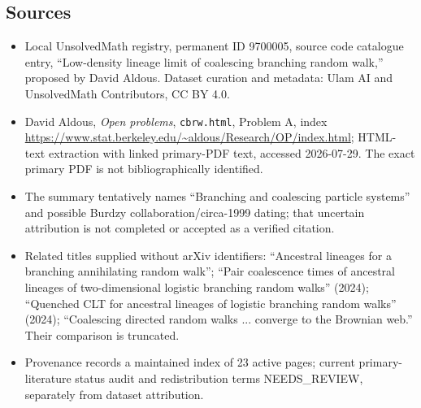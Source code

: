 \documentclass[11pt]{article}
\begin{document}
\subsection{Sources}
\begin{itemize}
\item Local UnsolvedMath registry, permanent ID 9700005, source code catalogue entry, ``Low-density lineage limit of coalescing branching random walk,'' proposed by David Aldous. Dataset curation and metadata: Ulam AI and UnsolvedMath Contributors, CC BY 4.0.
\item David Aldous, \emph{Open problems}, \texttt{cbrw.html}, Problem A, index \url{https://www.stat.berkeley.edu/~aldous/Research/OP/index.html}; HTML-text extraction with linked primary-PDF text, accessed 2026-07-29. The exact primary PDF is not bibliographically identified.
\item The summary tentatively names ``Branching and coalescing particle systems'' and possible Burdzy collaboration/circa-1999 dating; that uncertain attribution is not completed or accepted as a verified citation.
\item Related titles supplied without arXiv identifiers: ``Ancestral lineages for a branching annihilating random walk''; ``Pair coalescence times of ancestral lineages of two-dimensional logistic branching random walks'' (2024); ``Quenched CLT for ancestral lineages of logistic branching random walks'' (2024); ``Coalescing directed random walks ... converge to the Brownian web.'' Their comparison is truncated.
\item Provenance records a maintained index of 23 active pages; current primary-literature status audit and redistribution terms NEEDS\_REVIEW, separately from dataset attribution.
\end{itemize}
\end{document}
